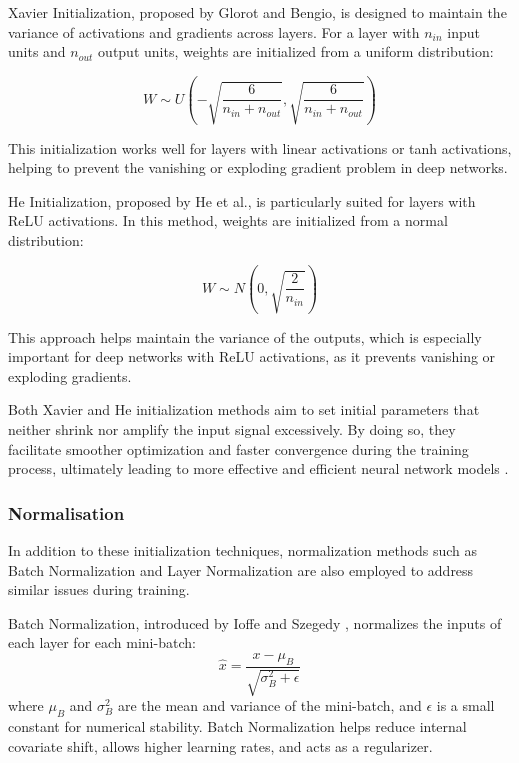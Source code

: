 \documentclass[a4paper, oneside]{discothesis}
\begin{document}
Xavier Initialization, proposed by Glorot and Bengio, is designed to maintain the variance of activations and gradients across layers. For a layer with $n_{in}$ input units and $n_{out}$ output units, weights are initialized from a uniform distribution:

\begin{equation}
    W \sim U\left(-\sqrt{\frac{6}{n_{in} + n_{out}}}, \sqrt{\frac{6}{n_{in} + n_{out}}}\right)
\end{equation}

This initialization works well for layers with linear activations or tanh activations, helping to prevent the vanishing or exploding gradient problem in deep networks.

He Initialization, proposed by He et al., is particularly suited for layers with ReLU activations. In this method, weights are initialized from a normal distribution:

\begin{equation}
    W \sim N\left(0, \sqrt{\frac{2}{n_{in}}}\right)
\end{equation}

This approach helps maintain the variance of the outputs, which is especially important for deep networks with ReLU activations, as it prevents vanishing or exploding gradients.

Both Xavier and He initialization methods aim to set initial parameters that neither shrink nor amplify the input signal excessively. By doing so, they facilitate smoother optimization and faster convergence during the training process, ultimately leading to more effective and efficient neural network models \cite{glorot2010understanding, he2015delving}.

\subsubsection{Normalisation}

In addition to these initialization techniques, normalization methods such as Batch Normalization and Layer Normalization are also employed to address similar issues during training.

Batch Normalization, introduced by Ioffe and Szegedy \cite{ioffe2015batch}, normalizes the inputs of each layer for each mini-batch:
\begin{equation}
    \hat{x} = \frac{x - \mu_B}{\sqrt{\sigma_B^2 + \epsilon}}
\end{equation}
where $\mu_B$ and $\sigma_B^2$ are the mean and variance of the mini-batch, and $\epsilon$ is a small constant for numerical stability. Batch Normalization helps reduce internal covariate shift, allows higher learning rates, and acts as a regularizer.
\end{document}
